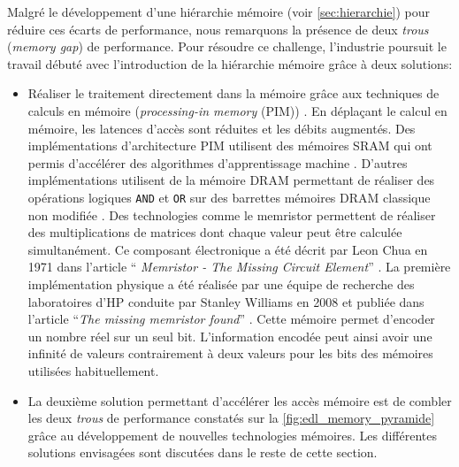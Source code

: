         Malgré le développement d'une hiérarchie mémoire (voir \autoref{sec:hierarchie}) pour réduire ces écarts de performance, nous remarquons  la présence de deux \textit{trous} (\textit{memory gap}) de performance. Pour résoudre ce challenge, l'industrie poursuit le travail débuté avec l'introduction de la hiérarchie mémoire grâce à deux solutions: 
        \begin{itemize}
            \item Réaliser le traitement directement dans la mémoire grâce aux techniques de calculs en mémoire (\textit{processing-in memory} (PIM)) \cite{Singh2019}. En déplaçant le calcul en mémoire, les latences d'accès sont réduites et les débits augmentés. Des implémentations d'architecture PIM utilisent des mémoires SRAM qui ont permis d'accélérer des algorithmes d'apprentissage machine \cite{Zhang2016, Biswas2018, Kang2018}. D'autres implémentations utilisent de la mémoire DRAM \cite{Seshadri2017} \cite{Li2017} permettant de réaliser des opérations logiques \verb|AND| et \verb|OR| sur des  barrettes mémoires DRAM classique non modifiée \cite{Gao2019}. Des technologies comme le memristor permettent de réaliser des multiplications de matrices dont chaque valeur peut être calculée simultanément. Ce composant électronique a été décrit par Leon Chua en 1971 dans l'article ``\textit{ Memristor - The Missing Circuit Element}''  \cite{Chua1971}. La première implémentation physique a été réalisée par une équipe de recherche des laboratoires d'HP conduite par Stanley Williams en 2008 et publiée dans l'article ``\textit{The missing memristor found}'' \cite{Strukov2008}. Cette mémoire permet d'encoder un nombre réel sur un seul bit. L'information encodée peut ainsi avoir une infinité de valeurs contrairement à deux valeurs pour les bits des mémoires utilisées habituellement.
            
            \item La deuxième solution permettant d'accélérer les accès mémoire est de combler les deux \textit{trous} de performance constatés sur la \autoref{fig:edl_memory_pyramide} grâce au développement de nouvelles technologies mémoires. Les différentes solutions envisagées sont discutées dans le reste de cette section.
        \end{itemize}
        
        
    
    
